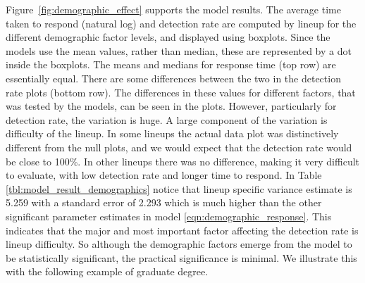 \documentclass[10pt]{article}\usepackage[]{graphicx}\usepackage[]{color}
\begin{document}
Figure~\ref{fig:demographic_effect} supports the model results. The average time taken to respond (natural log) and detection rate are computed by lineup for the different demographic factor levels, and displayed using boxplots. Since the models use the mean values, rather than median, these are represented by a dot inside the boxplots. %
The means and medians for response time (top row) are essentially equal. There are some differences between the two in the detection rate plots (bottom row). The differences in these values for different factors, that was tested by the models, can be seen in the plots. However, particularly for detection rate, the variation is huge. A large component of the variation is difficulty of the lineup. In some lineups the actual data plot was distinctively different from the null plots, and we would expect that the detection rate would be close to 100\%. In other lineups there was no difference, making it very difficult to evaluate, with low detection rate and longer time to respond. In Table \ref{tbl:model_result_demographics} notice that lineup specific variance estimate is 5.259 with a standard error of 2.293 which is much higher than the other significant parameter estimates in model \eqref{eqn:demographic_response}. This indicates that the major and most important factor affecting the detection rate is  lineup difficulty.  So although the demographic factors emerge from the model to be statistically significant, the practical significance is minimal. We illustrate this with the following example of graduate degree.

\end{document}
